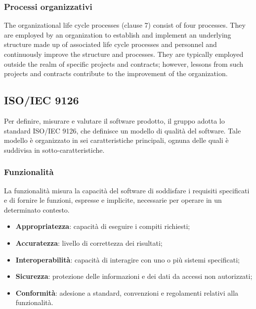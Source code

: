 \subsubsection{Processi organizzativi}
The organizational life cycle processes (clause 7) consist of four processes. They are employed by an
organization to establish and implement an underlying structure made up of associated life cycle
processes and personnel and continuously improve the structure and processes. They are typically
employed outside the realm of specific projects and contracts; however, lessons from such projects and
contracts contribute to the improvement of the organization.

\subsection{ISO/IEC 9126}
Per definire, misurare e valutare il software prodotto, il gruppo adotta lo 
standard ISO/IEC 9126, che definisce un modello di qualità del software. Tale 
modello è organizzato in sei caratteristiche principali, 
ognuna delle quali è suddivisa in sotto-caratteristiche.

\subsubsection{Funzionalità}
La funzionalità misura la capacità del software di soddisfare i requisiti specificati e di fornire le funzioni,
espresse e implicite, necessarie per operare in un determinato contesto.
\begin{itemize}
    \item \textbf{Appropriatezza}: capacità di eseguire i compiti richiesti;
    \item \textbf{Accuratezza}: livello di correttezza dei risultati;
    \item \textbf{Interoperabilità}: capacità di interagire con uno o più sistemi specificati;
    \item \textbf{Sicurezza}: protezione delle informazioni e dei dati da accessi non autorizzati;
    \item \textbf{Conformità}: adesione a standard, convenzioni e regolamenti relativi alla funzionalità.
\end{itemize}

